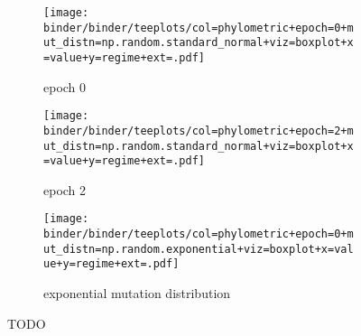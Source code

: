 \begin{figure*}
  \centering
  \begin{subfigure}[b]{\textwidth}
    \centering
    \texttt{[image: binder/binder/teeplots/col=phylometric+epoch=0+mut\_distn=np.random.standard\_normal+viz=boxplot+x=value+y=regime+ext=.pdf]}
    \caption{epoch 0}
    \label{fig:perfect-tree-phylometrics-sensitivity-analysis:epoch0}
  \end{subfigure}
  \begin{subfigure}[b]{\textwidth}
    \centering
    \texttt{[image: binder/binder/teeplots/col=phylometric+epoch=2+mut\_distn=np.random.standard\_normal+viz=boxplot+x=value+y=regime+ext=.pdf]}
    \caption{epoch 2}
    \label{fig:perfect-tree-phylometrics-sensitivity-analysis:epoch2}
  \end{subfigure}
  \begin{subfigure}[b]{\textwidth}
    \centering
    \texttt{[image: binder/binder/teeplots/col=phylometric+epoch=0+mut\_distn=np.random.exponential+viz=boxplot+x=value+y=regime+ext=.pdf]}
    \caption{exponential mutation distribution}
    \label{fig:perfect-tree-phylometrics-sensitivity-analysis:exponential}
  \end{subfigure}
  \caption{TODO}
  \label{fig:perfect-tree-phylometrics-sensitivity-analysis}
\end{figure*}
